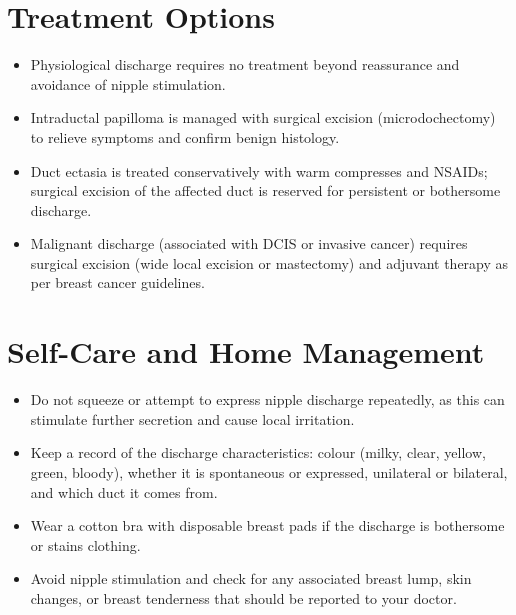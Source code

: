 \section*{Treatment Options}
\begin{itemize}
  \item Physiological discharge requires no treatment beyond reassurance and avoidance of nipple stimulation.
  \item Intraductal papilloma is managed with surgical excision (microdochectomy) to relieve symptoms and confirm benign histology.
  \item Duct ectasia is treated conservatively with warm compresses and NSAIDs; surgical excision of the affected duct is reserved for persistent or bothersome discharge.
  \item Malignant discharge (associated with DCIS or invasive cancer) requires surgical excision (wide local excision or mastectomy) and adjuvant therapy as per breast cancer guidelines.
\end{itemize}

\section*{Self-Care and Home Management}
\begin{itemize}
  \item Do not squeeze or attempt to express nipple discharge repeatedly, as this can stimulate further secretion and cause local irritation.
  \item Keep a record of the discharge characteristics: colour (milky, clear, yellow, green, bloody), whether it is spontaneous or expressed, unilateral or bilateral, and which duct it comes from.
  \item Wear a cotton bra with disposable breast pads if the discharge is bothersome or stains clothing.
  \item Avoid nipple stimulation and check for any associated breast lump, skin changes, or breast tenderness that should be reported to your doctor.
\end{itemize}

